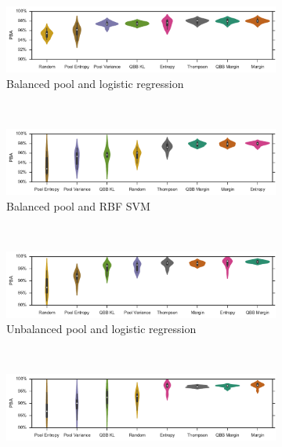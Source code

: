 \begin{figure}[p]
	\centering
	\begin{subfigure}{\textwidth}
		\centering
		\includegraphics[width=\textwidth]{figures/5_active/vstatlas_bl_ind_violin}
		\caption{Balanced pool and logistic regression}
		\label{fig:vstatlas_bl_ind_violin}
	\end{subfigure}\\
	\begin{subfigure}{\textwidth}
		\centering
		\includegraphics[width=\linewidth]{figures/5_active/vstatlas_br_ind_violin}
		\caption{Balanced pool and RBF SVM}
		\label{fig:vstatlas_br_ind_violin}
	\end{subfigure}\\
	\begin{subfigure}{\textwidth}
		\centering
		\includegraphics[width=\textwidth]{figures/5_active/vstatlas_ul_ind_violin}
		\caption{Unbalanced pool and logistic regression}
		\label{fig:vstatlas_ul_ind_violin}
	\end{subfigure}\\
	\begin{subfigure}{\textwidth}
		\centering
		\includegraphics[width=\linewidth]{figures/5_active/vstatlas_ur_ind_violin}

\end{subfigure}
\end{figure}
